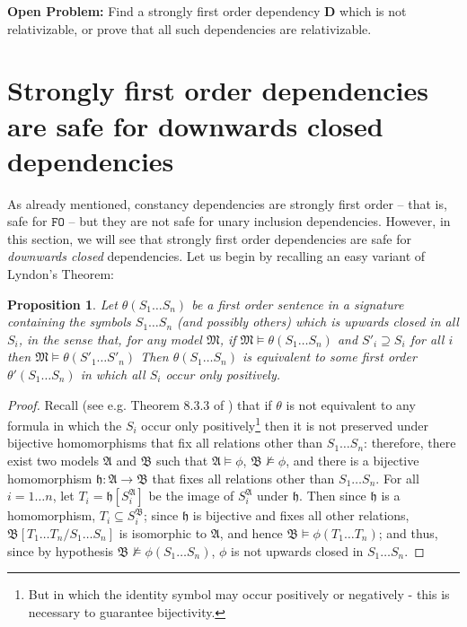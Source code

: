 \documentclass{article}
\newtheorem{Proposition}[Theorem]{Proposition}
\theoremstyle{definition}
\newcommand{\FO}{\texttt{FO}}
\newcommand{\M}{\mathfrak M}
\newcommand{\D}{\mathbf D}
\begin{document}
\noindent \textbf{Open Problem:} Find a strongly first order dependency $\D$ which is not relativizable, or prove that all such dependencies are relativizable. 
\section{Strongly first order dependencies are safe for downwards closed dependencies}
As already mentioned, constancy dependencies are strongly first order -- that is, safe for $\FO$ -- but they are not safe for unary inclusion dependencies. However, in this section, we will see that strongly first order dependencies are safe for \emph{downwards closed} dependencies. Let us begin by recalling an easy variant of Lyndon's Theorem: 
\begin{Proposition}
	Let $\theta(S_1 \ldots S_n)$ be a first order sentence in a signature containing the symbols $S_1 \ldots S_n$ (and possibly others) which is \emph{upwards closed} in all $S_i$, in the sense that, for any model $\M$, if $\M \models \theta(S_1 \ldots S_n)$ and $S'_i \supseteq S_i$ for all $i$ then $\M \models \theta(S'_1 \ldots S'_n)$ Then $\theta(S_1 \ldots S_n)$ is equivalent to some first order $\theta'(S_1 \ldots S_n)$ in which all $S_i$ occur only positively. 
	\label{propo:lyndon}
\end{Proposition}
\begin{proof}
	Recall (see e.g. Theorem 8.3.3 of \cite{hodges97b}) that if $\theta$ is not equivalent to any formula in which the $S_i$ occur only positively\footnote{But in which the identity symbol may occur positively or negatively - this is necessary to guarantee bijectivity.} then it is not preserved under bijective homomorphisms that fix all relations other than $S_1 \ldots S_n$: therefore, there exist two models $\mathfrak A$ and $\mathfrak B$ such that $\mathfrak A  \models \phi$, $\mathfrak B \not \models \phi$, and there is a bijective homomorphism $\mathfrak h: \mathfrak A \rightarrow \mathfrak B$ that fixes all relations other than $S_1 \ldots S_n$. For all $i = 1 \ldots n$, let $T_i = \mathfrak h[S_i^{\mathfrak A}]$ be the image of $S_i^{\mathfrak A}$ under $\mathfrak h$. Then since $\mathfrak h$ is a homomorphism, $T_i \subseteq S_i^{\mathfrak B}$; since $\mathfrak h$ is bijective and fixes all other relations, $\mathfrak B[T_1 \ldots T_n/S_1 \ldots S_n]$ is isomorphic to $\mathfrak A$, and hence $\mathfrak B \models \phi(T_1 \ldots T_n)$; and thus, since by hypothesis $\mathfrak B \not \models \phi(S_1 \ldots S_n)$, $\phi$ is not upwards closed in $S_1 \ldots S_n$. 
\end{proof}
\end{document}
